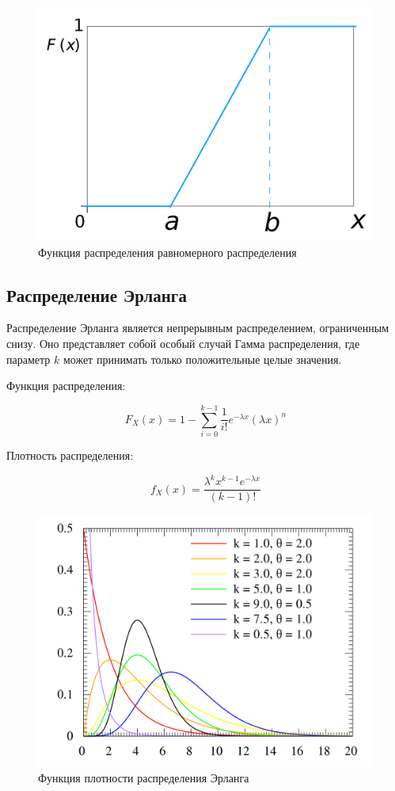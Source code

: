 \begin{figure}[H]
    \begin{center}
    \includegraphics[width=0.5\linewidth]{assets/uni_Fx.png}
    \caption{Функция распределения равномерного распределения}
    \label{fig:}
    \end{center}
\end{figure}

\subsection{Распределение Эрланга}

Распределение Эрланга является непрерывным распределением, ограниченным снизу. Оно представляет собой особый случай Гамма распределения, где параметр $k$ может принимать только положительные целые значения.

Функция распределения:

\begin{equation*}
F_X(x) = 1 - \sum_{i=0}^{k-1}  \frac{1}{i!} e^{-\lambda x} (\lambda x)^n
\end{equation*}
    
Плотность распределения:

\begin{equation*}
f_X(x) = \frac{\lambda^k x^{k-1} e^{-\lambda x} } {(k-1)!}
\end{equation*}

\begin{figure}[H]
    \begin{center}
    \includegraphics[width=0.5\linewidth]{assets/erlang_f.png}
    \caption{Функция плотности распределения Эрланга}
    \label{fig:}
    \end{center}
\end{figure}

